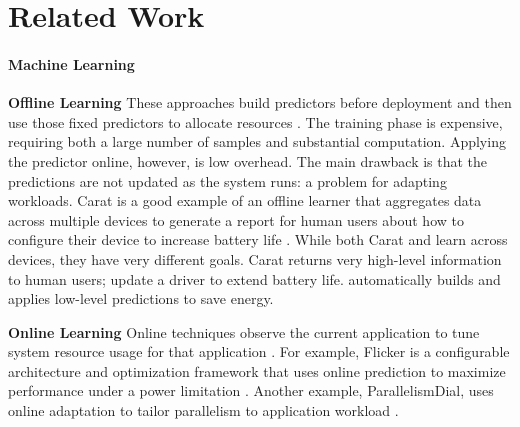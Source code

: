 \section{Related Work}

\paragraph{Machine Learning}


\noindent \textbf{Offline Learning} These approaches build predictors
before deployment and then use those fixed predictors to allocate
resources
\cite{Yi2003,LeeBrooks2006,CPR,ChenJohn2011,petabricksStatic}.  The
training phase is expensive, requiring both a large number of
samples and substantial computation.  Applying the predictor online,
however, is low overhead.  The main drawback is that the predictions are
not updated as the system runs: a problem for adapting workloads.
  Carat is a good example of an
offline learner that aggregates data across multiple devices to
generate a report for human users about how to configure their device
to increase battery life \cite{carat}.  While both Carat and \SYSTEM{}
learn across devices, they have very different goals.  Carat returns
very high-level information to human users; \eg{} update a driver to
extend battery life.  \SYSTEM{} automatically builds and applies
low-level predictions to save energy.

\noindent \textbf{Online Learning} Online techniques observe the
current application to tune system resource usage for that application
\cite{Li2006,Flicker,ParallelismDial,Ponamarev,petabricksDynamic,LeeBrooks}.
For example, Flicker is a configurable architecture and optimization
framework that uses online prediction to maximize performance under a
power limitation \cite{Flicker}.  Another example, ParallelismDial,
uses online adaptation to tailor parallelism to application workload
\cite{ParallelismDial}.



